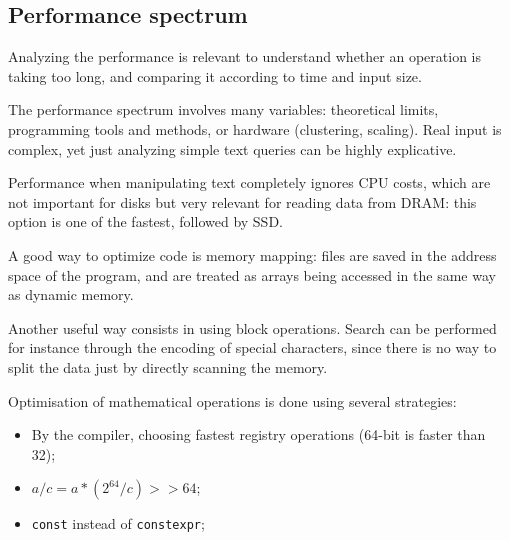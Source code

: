 \subsection{Performance spectrum}
Analyzing the performance is relevant to understand whether an operation is taking too long, and comparing it according to time and input size.

The performance spectrum involves many variables: theoretical limits, programming tools and methods, or hardware (clustering, scaling). Real input is complex, yet just analyzing simple text queries can be highly explicative.

Performance when manipulating text completely ignores CPU costs, which are not important for disks but very relevant for reading data from DRAM: this option is one of the fastest, followed by SSD.

A good way to optimize code is memory mapping: files are saved in the address space of the program, and are treated as arrays being accessed in the same way as dynamic memory. 

Another useful way consists in using block operations. Search can be performed for instance through the encoding of special characters, since there is no way to split the data just by directly scanning the memory.

Optimisation of mathematical operations is done using several strategies:
\begin{itemize}
	\item By the compiler, choosing fastest registry operations (64-bit is faster than 32);
	\item $a / c = a * (2^{64} / c) >> 64$;
	\item \texttt{const} instead of \texttt{constexpr};
\end{itemize}




